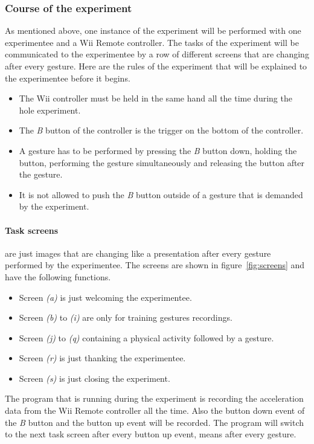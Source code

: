 \documentclass[runningheads,a4paper]{llncs}
\begin{document}
    \subsubsection{Course of the experiment}
    As mentioned above, one instance of the experiment will be performed with one experimentee and a Wii Remote
    controller. The tasks of the experiment will be communicated to the experimentee by a row of different screens that
    are changing after every gesture. Here are the rules of the experiment that will be explained to the experimentee
    before it begins.
    \begin{itemize}
        \item The Wii controller must be held in the same hand all the time during the hole experiment.
        \item The \textit{B} button of the controller is the trigger on the bottom of the controller.
        \item A gesture has to be performed by pressing the \textit{B} button down, holding the button, performing the
        gesture simultaneously and releasing the button after the gesture.
        \item It is not allowed to push the \textit{B} button outside of a gesture that is demanded by the experiment.
    \end{itemize}

    \paragraph{Task screens} are just images that are changing like a presentation after every gesture performed by the
    experimentee. The screens are shown in figure~\ref{fig:screens} and have the following functions.
    \begin{itemize}
        \item Screen \textit{(a)} is just welcoming the experimentee.
        \item Screen \textit{(b)} to \textit{(i)} are only for training gestures recordings.
        \item Screen \textit{(j)} to \textit{(q)} containing a physical activity followed by a gesture.
        \item Screen \textit{(r)} is just thanking the experimentee.
        \item Screen \textit{(s)} is just closing the experiment.
    \end{itemize}
    The program that is running during the experiment is recording the acceleration data from the Wii Remote controller
    all the time. Also the button down event of the \textit{B} button and the button up event will be recorded. The
    program will switch to the next task screen after every button up event, means after every gesture.
\end{document}
